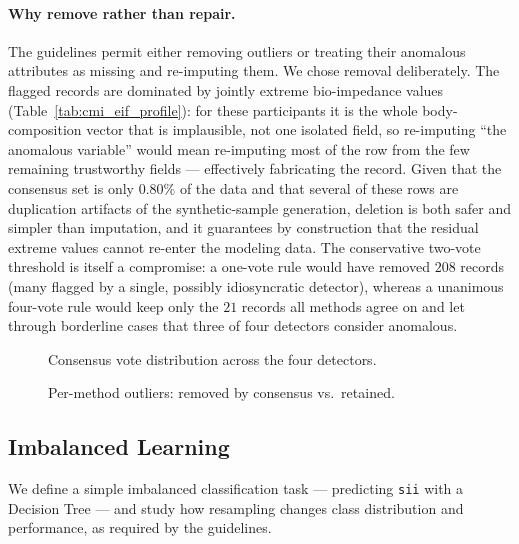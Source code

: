 \paragraph{Why remove rather than repair.} The guidelines permit either removing outliers or treating their anomalous attributes as missing and re-imputing them. We chose removal deliberately. The flagged records are dominated by jointly extreme bio-impedance values (Table~\ref{tab:cmi_eif_profile}): for these participants it is the whole body-composition vector that is implausible, not one isolated field, so re-imputing ``the anomalous variable'' would mean re-imputing most of the row from the few remaining trustworthy fields --- effectively fabricating the record. Given that the consensus set is only $0.80\%$ of the data and that several of these rows are duplication artifacts of the synthetic-sample generation, deletion is both safer and simpler than imputation, and it guarantees by construction that the residual extreme values cannot re-enter the modeling data. The conservative two-vote threshold is itself a compromise: a one-vote rule would have removed $208$ records (many flagged by a single, possibly idiosyncratic detector), whereas a unanimous four-vote rule would keep only the $21$ records all methods agree on and let through borderline cases that three of four detectors consider anomalous.

\begin{figure}[h]
    \centering
    \caption{Consensus vote distribution across the four detectors.}
    \label{fig:cmi_consensus}
\end{figure}

\begin{figure}[h]
    \centering
    \caption{Per-method outliers: removed by consensus vs.\ retained.}
    \label{fig:cmi_removed_kept}
\end{figure}

\subsection{Imbalanced Learning}
We define a simple imbalanced classification task --- predicting \texttt{sii} with a Decision Tree --- and study how resampling changes class distribution and performance, as required by the guidelines.

